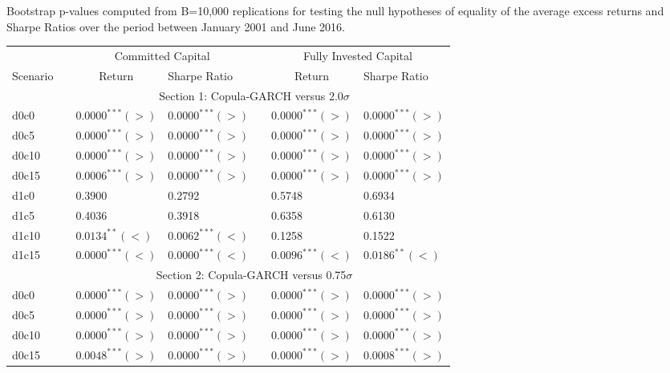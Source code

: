 \documentclass[a4paper,12pt]{report}
\begin{document}
\begin{refsection}
\vspace{0.3cm}

\begin{threeparttable}[H]
	\centering \scriptsize
	\caption{Bootstrap p-values computed from B=10,000 replications for testing the null hypotheses of equality of the average excess returns and Sharpe Ratios over the period between January 2001 and June 2016.}
	\begin{tabularx}{\textwidth}{@{\extracolsep{\fill}}lllllll@{}}
		\toprule
		& & \multicolumn{2}{c}{Committed Capital} & \multicolumn{1}{c}{} & \multicolumn{2}{c}{Fully Invested Capital} \\
		\cmidrule{3-4}  \cmidrule{6-7}
		\multicolumn{1}{c}{Scenario} & & \multicolumn{1}{c}{Return} & Sharpe Ratio &       & \multicolumn{1}{c}{Return}& Sharpe Ratio \\
		\midrule
		& \multicolumn{6}{c}{Section 1: Copula-GARCH versus 2.0$\sigma$} \\
		\midrule
		d0c0 & & $0.0000^{***}(>)$ & $0.0000^{***}(>)$ &       & $0.0000^{***}(>)$ & $0.0000^{***}(>)$ \\
		d0c5 & & $0.0000^{***}(>)$ & $0.0000^{***}(>)$ &       & $0.0000^{***}(>)$ & $0.0000^{***}(>)$   \\
		d0c10 & & $0.0000^{***}(>)$ & $0.0000^{***}(>)$ &       & $0.0000^{***}(>)$ & $0.0000^{***}(>)$ \\
		d0c15 & & $0.0006^{***}(>)$ & $0.0000^{***}(>)$ &       & $0.0000^{***}(>)$ & $0.0000^{***}(>)$ \\
		d1c0 & & 0.3900 & 0.2792  &       & 0.5748 & 0.6934 \\
		d1c5 & & 0.4036 & 0.3918 &       & 0.6358 & 0.6130 \\
		d1c10 & & $0.0134^{**}(<)$ & $0.0062^{***}(<)$ &       & 0.1258 & 0.1522 \\
		d1c15 & & $0.0000^{***}(<)$ & $0.0000^{***}(<)$ &       & $0.0096^{***}(<)$ & $0.0186^{**}(<)$ \\
		\midrule
		& \multicolumn{6}{c}{Section 2: Copula-GARCH versus 0.75$\sigma$} \\
		\midrule
		d0c0 & & $0.0000^{***}(>)$ & $0.0000^{***}(>)$ &       & $0.0000^{***}(>)$ & $0.0000^{***}(>)$ \\
		d0c5 & & $0.0000^{***}(>)$ & $0.0000^{***}(>)$ &       & $0.0000^{***}(>)$ & $0.0000^{***}(>)$   \\
		d0c10 & & $0.0000^{***}(>)$ & $0.0000^{***}(>)$ &       & $0.0000^{***}(>)$ & $0.0000^{***}(>)$ \\
		d0c15 & & $0.0048^{***}(>)$ & $0.0000^{***}(>)$ &       & $0.0000^{***}(>)$ & $0.0008^{***}(>)$ \\

\end{tabularx}
\end{threeparttable}
\end{refsection}
\end{document}
